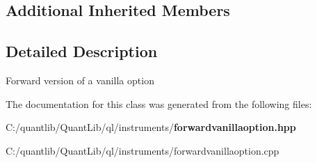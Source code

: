 \subsection*{Additional Inherited Members}


\subsection{Detailed Description}
Forward version of a vanilla option 



The documentation for this class was generated from the following files\+:\begin{DoxyCompactItemize}
\item 
C\+:/quantlib/\+Quant\+Lib/ql/instruments/{\bf forwardvanillaoption.\+hpp}\item 
C\+:/quantlib/\+Quant\+Lib/ql/instruments/forwardvanillaoption.\+cpp\end{DoxyCompactItemize}
